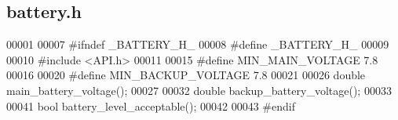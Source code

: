 \subsection{battery.\+h}
\label{battery_8h_source}

\begin{DoxyCode}
00001 
00007 \textcolor{preprocessor}{#ifndef \_BATTERY\_H\_}
00008 \textcolor{preprocessor}{#define \_BATTERY\_H\_}
00009 
00010 \textcolor{preprocessor}{#include <API.h>}
00011 
00015 \textcolor{preprocessor}{#define MIN\_MAIN\_VOLTAGE 7.8}
00016 
00020 \textcolor{preprocessor}{#define MIN\_BACKUP\_VOLTAGE 7.8}
00021 
00026 \textcolor{keywordtype}{double} main_battery_voltage();
00027 
00032 \textcolor{keywordtype}{double} backup_battery_voltage();
00033 
00041 \textcolor{keywordtype}{bool} battery_level_acceptable();
00042 
00043 \textcolor{preprocessor}{#endif}
\end{DoxyCode}
